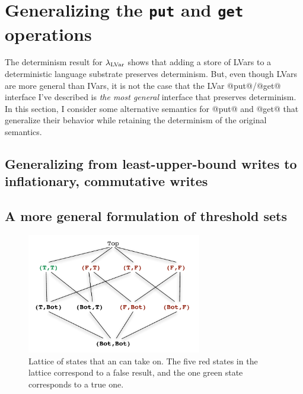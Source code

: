 \section{Generalizing the \lstinline|put| and \lstinline|get| operations} \label{s:lvars-generalizing}

The determinism result for $\lambda_{\textrm{LVar}}$ shows that adding a store of
LVars to a deterministic language substrate preserves determinism.
But, even though LVars are more general than IVars, it is not the case
that the LVar @put@/@get@ interface I've described is \emph{the most
  general} interface that preserves determinism.  In this section, I
consider some alternative semantics for @put@ and @get@ that
generalize their behavior while retaining the determinism of the
original semantics.

\subsection{Generalizing from least-upper-bound writes to inflationary, commutative writes}




\subsection{A more general formulation of threshold sets}

\begin{figure}
\begin{center}
  \includegraphics[width=3in]{chapter2/figures/lvars-parallel-and.pdf}
\end{center}
  \caption{Lattice of states that an  can take on.  The five
    red states in the lattice correspond to a false result, and the
    one green state corresponds to a true one.}
  \label{f:lvars-parallel-and}
\end{figure}

